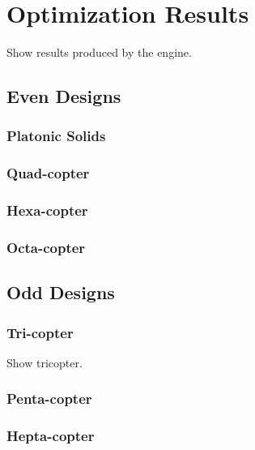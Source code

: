 \chapter{Optimization Results}
\label{sec:optimization_results}
Show results produced by the engine.

\section{Even Designs}
\label{sec:even_designs}

\subsection{Platonic Solids}
\label{sec:platonic_solids}

\subsection{Quad-copter}
\label{sec:quad_copter}

\subsection{Hexa-copter}
\label{sec:hexa_copter}

\subsection{Octa-copter}
\label{sec:octa_copter}

\section{Odd Designs}
\label{sec:odd_designs}

\subsection{Tri-copter}
\label{sec:tri_copter}
Show tricopter.

\subsection{Penta-copter}
\label{sec:penta_copter}

\subsection{Hepta-copter}
\label{sec:hepta_copter}

